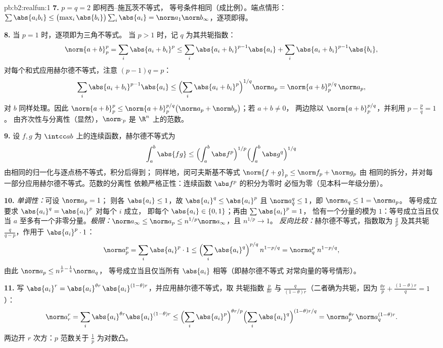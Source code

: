 \begin{solution}{pb:b2:realfun:1}
\textbf{7.} $p = q = 2$ 即柯西--施瓦茨不等式，
等号条件相同（成比例）。端点情形：$\sum\abs{a_ib_i}
\leq \bigl(\max_i\abs{b_i}\bigr)\sum_i\abs{a_i} =
\norm a_1\norm b_\infty$，逐项即得。

\textbf{8.} 当 $p = 1$ 时，逐项即为三角不等式。
当 $p > 1$ 时，记 $q$ 为其共轭指数：
\[
\norm{a+b}_p^p = \sum_i\abs{a_i + b_i}^p
\leq \sum_i\abs{a_i+b_i}^{p-1}\abs{a_i} +
\sum_i\abs{a_i+b_i}^{p-1}\abs{b_i},
\]
对每个和式应用赫尔德不等式，注意 $(p - 1)q = p$：
\[
\sum_i\abs{a_i+b_i}^{p-1}\abs{a_i} \leq
\Bigl(\sum_i\abs{a_i+b_i}^{p}\Bigr)^{1/q}\norm a_p
= \norm{a + b}_p^{p/q}\,\norm a_p ,
\]
对 $b$ 同样处理。因此 $\norm{a+b}_p^p \leq \norm{a +
b}_p^{p/q}\bigl(\norm a_p + \norm b_p\bigr)$；若 $a + b \neq 0$，
两边除以 $\norm{a+b}_p^{p/q}$，并利用 $p - \frac pq = 1$。
由齐次性与分离性（显然），$\norm\cdot_p$ 是
$\R^n$ 上的范数。

\textbf{9.} 设 $f, g$ 为 $\intcc ab$ 上的连续函数，赫尔德不等式为
\[
\int_a^b\abs{fg} \leq \Bigl(\int_a^b\abs
f^p\Bigr)^{1/p}\Bigl(\int_a^b\abs g^q\Bigr)^{1/q}
\]
由相同的归一化与逐点杨不等式，积分后得到；
同样地，闵可夫斯基不等式 $\norm{f + g}_p \leq \norm f_p + \norm g_p$ 由
相同的拆分，并对每一部分应用赫尔德不等式。范数的分离性
依赖严格正性：连续函数 $\abs f^p$ 的积分为零时
必恒为零（见本科一年级分册）。

\textbf{10.} \emph{单调性：}可设 $\norm a_p = 1$；
则各 $\abs{a_i} \leq 1$，故 $\abs{a_i}^q \leq \abs{a_i}^p$
且 $\norm a_q^q \leq 1$，即 $\norm a_q \leq 1 = \norm a_p$。
等号成立要求 $\abs{a_i}^q = \abs{a_i}^p$ 对每个 $i$ 成立，
即每个 $\abs{a_i} \in \{0, 1\}$；再由 $\sum\abs{a_i}^p = 1$，
恰有一个分量的模为 $1$：等号成立当且仅当
$a$ 至多有一个非零分量。\emph{极限：}$\norm a_\infty \leq
\norm a_p \leq n^{1/p}\norm a_\infty$，且 $n^{1/p} \to 1$。
\emph{反向比较：}赫尔德不等式，指数取为 $\frac
qp$ 及其共轭 $\frac{q}{q-p}$，作用于
$\abs{a_i}^p\cdot 1$：
\[
\norm a_p^p = \sum_i\abs{a_i}^p\cdot 1 \leq
\Bigl(\sum_i\abs{a_i}^{q}\Bigr)^{p/q}\,n^{1 - p/q}
= \norm a_q^{p}\; n^{1-p/q},
\]
由此 $\norm a_p \leq n^{\frac1p - \frac1q}\norm a_q$，
等号成立当且仅当所有 $\abs{a_i}$ 相等（即赫尔德不等式
对常向量的等号情形）。

\textbf{11.} 写 $\abs{a_i}^r = \abs{a_i}^{\theta
r}\,\abs{a_i}^{(1-\theta)r}$，并应用赫尔德不等式，取
共轭指数 $\frac{p}{\theta r}$ 与
$\frac{q}{(1-\theta)r}$（二者确为共轭，因为 $\frac{\theta
r}p + \frac{(1-\theta)r}q = 1$）：
\[
\norm a_r^r = \sum_i \abs{a_i}^{\theta r}\abs{a_i}^{(1-\theta)r}
\leq \Bigl(\sum_i\abs{a_i}^{p}\Bigr)^{\theta r/p}
\Bigl(\sum_i\abs{a_i}^{q}\Bigr)^{(1-\theta)r/q}
= \norm a_p^{\theta r}\,\norm a_q^{(1-\theta)r} .
\]
两边开 $r$ 次方：$p$ 范数关于 $\frac1p$ 为对数凸。


\end{solution}
